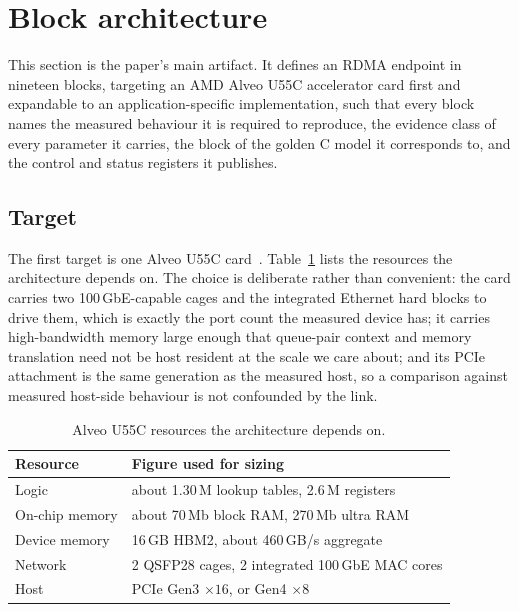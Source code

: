\section{Block architecture}
\label{sec:arch}

This section is the paper's main artifact. It defines an RDMA endpoint in
nineteen blocks, targeting an AMD Alveo U55C accelerator card first and
expandable to an application-specific implementation, such that every block
names the measured behaviour it is required to reproduce, the evidence class of
every parameter it carries, the block of the golden C model it corresponds to,
and the control and status registers it publishes.

\subsection{Target}
\label{sec:arch:target}

The first target is one Alveo U55C card~\cite{alveo-u55c}.
Table~\ref{tab:u55c} lists the resources the architecture depends on. The choice is deliberate rather than
convenient: the card carries two 100\,GbE-capable cages and the integrated
Ethernet hard blocks to drive them, which is exactly the port count the
measured device has; it carries high-bandwidth memory large enough that
queue-pair context and memory translation need not be host resident at the
scale we care about; and its PCIe attachment is the same generation as the
measured host, so a comparison against measured host-side behaviour is not
confounded by the link.

\begin{table}[t]
  \centering
  \small
  \caption{Alveo U55C resources the architecture depends on.
    }
  \label{tab:u55c}
  \begin{tabular}{@{}ll@{}}
    \toprule
    Resource & Figure used for sizing \\
    \midrule
    Logic & about 1.30\,M lookup tables, 2.6\,M registers \\
    On-chip memory & about 70\,Mb block RAM, 270\,Mb ultra RAM \\
    Device memory & 16\,GB HBM2, about 460\,GB/s aggregate \\
    Network & 2 QSFP28 cages, 2 integrated 100\,GbE MAC cores \\
    Host & PCIe Gen3 $\times 16$, or Gen4 $\times 8$ \\
    \bottomrule
  \end{tabular}
\end{table}

